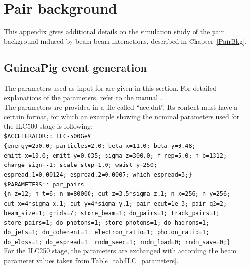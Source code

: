 \chapter{Pair background}
\label{Appendix:Pairs}

This appendix gives additional details on the simulation study of the pair background induced by beam-beam interactions, described in Chapter~\ref{PairBkg}.

\section{GuineaPig event generation}
\label{Appendix:Pairs:GuineaPig}
The parameters used as input for \guineapig are given in this section.
For detailed explanations of the \guineapig parameters, refer to the \guineapig manual~\cite{GuineaPigMan}.
\\The parameters are provided in a file called ``acc.dat''.
Its content must have a certain format, for which an example showing the nominal parameters used for the ILC500 stage is following:\vspace*{0.1cm}\\
\texttt{\$ACCELERATOR:: ILC-500GeV\\
\{energy=250.0; particles=2.0; beta\_x=11.0; beta\_y=0.48;\\
emitt\_x=10.0; emitt\_y=0.035; sigma\_z=300.0; f\_rep=5.0; n\_b=1312;\\
charge\_sign=-1; scale\_step=1.0; waist\_y=250;\\
espread.1=0.00124; espread.2=0.0007; which\_espread=3;\}\\
\$PARAMETERS:: par\_pairs\\
\{n\_z=12; n\_t=6; n\_m=80000; cut\_z=3.5*sigma\_z.1; n\_x=256; n\_y=256;\\
cut\_x=4*sigma\_x.1; cut\_y=4*sigma\_y.1; pair\_ecut=1e-3; pair\_q2=2;\\
beam\_size=1; grids=7; store\_beam=1; do\_pairs=1; track\_pairs=1;\\
store\_pairs=1; do\_photons=1; store\_photons=1; do\_hadrons=1;\\
do\_jets=1; do\_coherent=1; electron\_ratio=1; photon\_ratio=1;\\
do\_eloss=1; do\_espread=1; rndm\_seed=1; rndm\_load=0; rndm\_save=0;\}
}
\vspace*{0.2cm}\\For the ILC250 stage, the parameters are exchanged with according the beam parameter values taken from Table~\ref{tab:ILC_parameters}.

